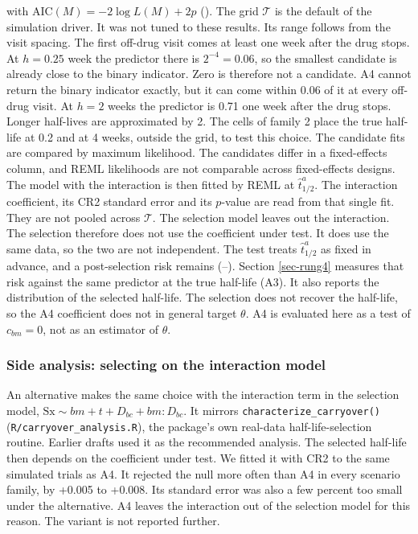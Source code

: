 \documentclass[
  11pt,
]{article}
\begin{document}
with \(\text{AIC}(M) = -2\log L(M) + 2p\) (). The grid
\(\mathcal{T}\) is the default of the simulation driver. It was not
tuned to these results. Its range follows from the visit spacing. The
first off-drug visit comes at least one week after the drug stops.
At \(h = 0.25\) week the predictor there is \(2^{-4} = 0.06\), so the
smallest candidate is already close to the binary indicator. Zero is
therefore not a candidate. A4 cannot return the binary indicator
exactly, but it can come within 0.06 of it at every off-drug visit.
At \(h = 2\) weeks the predictor is 0.71 one week after the drug stops.
Longer half-lives are approximated by 2. The cells of family 2 place
the true half-life at 0.2 and at 4 weeks, outside the grid, to test
this choice. The candidate fits are compared by maximum likelihood.
The candidates differ in a fixed-effects column, and REML likelihoods
are not comparable across fixed-effects designs. The model with the
interaction is then fitted by REML at \(\hat{t}^{a}_{1/2}\). The
interaction coefficient, its CR2 standard error and its \(p\)-value are
read from that single fit. They are not pooled across \(\mathcal{T}\).
The selection model leaves out the interaction. The selection therefore
does not use the coefficient under test. It does use the same data,
so the two are not independent. The test treats \(\hat t^{a}_{1/2}\)
as fixed in advance, and a post-selection risk remains
(--). Section
\ref{sec-rung4} measures that risk against the same predictor at the
true half-life (A3). It also reports the distribution of the selected
half-life. The selection does not recover the half-life, so the A4
coefficient does not in general target \(\theta\). A4 is evaluated here
as a test of \(c_{bm} = 0\), not as an estimator of \(\theta\).

\subsubsection{Side analysis: selecting on the interaction model}\label{sec-comparators}

An alternative makes the same choice with the interaction term in
the selection model, \(\text{Sx} \sim bm + t + D_{bc} +
bm{:}D_{bc}\). It mirrors \texttt{characterize\_carryover()}
(\texttt{R/carryover\_analysis.R}), the package's own real-data
half-life-selection routine. Earlier drafts used it as the
recommended analysis. The selected half-life then depends on the
coefficient under test. We fitted it with CR2 to the same simulated
trials as A4. It rejected the null more often than A4 in every
scenario family, by +0.005 to +0.008. Its standard
error was also a few percent too small under the alternative. A4
leaves the interaction out of the selection model for this reason.
The variant is not reported further.
\end{document}
